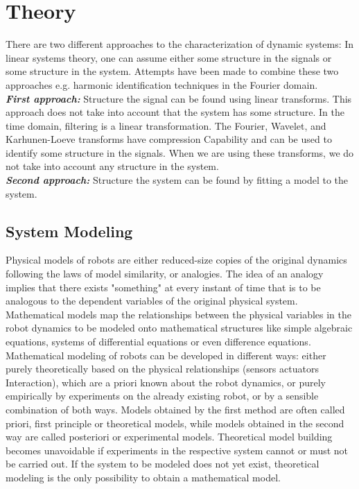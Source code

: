 \section{Theory}
\label{Sec:Th}
There are two different approaches to the characterization of dynamic systems: In linear systems theory, one can assume either some structure in the signals or some structure in the system. Attempts have been made to combine these two approaches e.g. harmonic identification techniques in the Fourier domain.\\ 
\textbf{\textit{First approach:}} Structure the signal can be found using linear transforms. This approach does not take into account that the system has some structure. In the time domain, filtering is a linear transformation. The Fourier, Wavelet, and Karhunen-Loeve transforms have compression Capability and can be used to identify some structure in the signals. When we are using these transforms, we do not take into account any structure in the system.\\ 
\textbf{\textit{Second approach:}} Structure the system can be found by fitting a model to the system. 

\subsection{System Modeling}
Physical models of robots are either reduced-size copies of the original dynamics following the laws of model similarity, or analogies. The idea of an analogy implies that there exists "something" at every instant of time that is to be analogous to the dependent variables of the original physical system. Mathematical models map the relationships between the physical variables in the robot dynamics to be modeled onto mathematical structures like simple algebraic equations, systems of differential equations or even  difference equations. Mathematical modeling of robots can be developed in different ways: either purely theoretically based on the physical relationships (sensors actuators Interaction), which are a priori known about the robot dynamics, or purely empirically by experiments on the already existing robot, or by a sensible combination of both ways. Models obtained by the first method are often called priori, first principle or theoretical models, while models obtained in the second way are called posteriori or experimental models. Theoretical model building becomes unavoidable if experiments in the respective system cannot or must not be carried out. If the system to be modeled does not yet exist, theoretical modeling is the only possibility to obtain a mathematical model.

